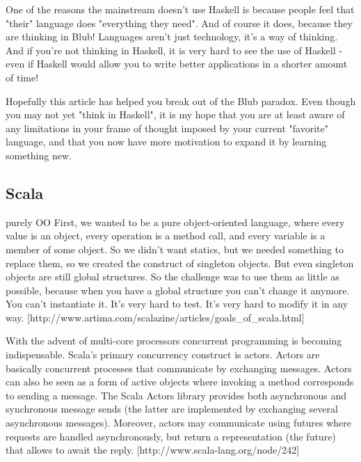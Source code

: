 \documentclass[main.tex]{subfiles}
\begin{document}
{{One of the reasons the mainstream doesn't use Haskell is because people feel that "their" language does "everything they need". And of course it does, because they are thinking in Blub! Languages aren't just technology, it's a way of thinking. And if you're not thinking in Haskell, it is very hard to see the use of Haskell - even if Haskell would allow you to write better applications in a shorter amount of time!

Hopefully this article has helped you break out of the Blub paradox. Even though you may not yet "think in Haskell", it is my hope that you are at least aware of any limitations in your frame of thought imposed by your current "favorite" language, and that you now have more motivation to expand it by learning something new.

\subsection{Scala}

purely OO First, we wanted to be a pure object-oriented language, where every value is an object, every operation is a method call, and every variable is a member of some object. So we didn't want statics, but we needed something to replace them, so we created the construct of singleton objects. But even singleton objects are still global structures. So the challenge was to use them as little as possible, because when you have a global structure you can't change it anymore. You can't instantiate it. It's very hard to test. It's very hard to modify it in any way. [http://www.artima.com/scalazine/articles/goals_of_scala.html]

With the advent of multi-core processors concurrent programming is becoming indispensable. Scala's primary concurrency construct is actors. Actors are basically concurrent processes that communicate by exchanging messages. Actors can also be seen as a form of active objects where invoking a method corresponds to sending a message.
The Scala Actors library provides both asynchronous and synchronous message sends (the latter are implemented by exchanging several asynchronous messages). Moreover, actors may communicate using futures where requests are handled asynchronously, but return a representation (the future) that allows to await the reply. [http://www.scala-lang.org/node/242]

}}
\end{document}
